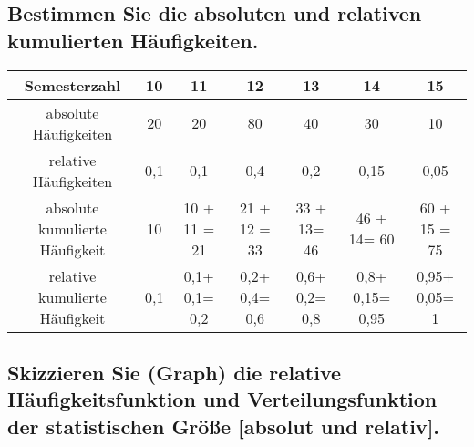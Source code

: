 \documentclass{article}
\begin{document}
\subsection{Bestimmen Sie die absoluten und relativen kumulierten Häufigkeiten.}
\begin{center}
\begin{tabular}{| c | c | c | c | c | c | c | } 
\hline
Semesterzahl & 10 & 11 & 12 & 13 & 14 & 15 \\ 
\hline
absolute Häufigkeiten & 20 & 20 & 80 & 40 & 30 & 10 \\ 
\hline
relative Häufigkeiten & 0,1 & 0,1 & 0,4 & 0,2 & 0,15 & 0,05 \\
\hline
absolute kumulierte Häufigkeit & 10 & 10 + 11 = 21 & 21 + 12 = 33 & 33 + 13= 46 & 46 + 14= 60 & 60 + 15 = 75\\
\hline
relative kumulierte Häufigkeit & 0,1 & 0,1+ 0,1= 0,2 & 0,2+ 0,4= 0,6 & 0,6+ 0,2= 0,8 & 0,8+ 0,15= 0,95 & 0,95+ 0,05= 1\\
\hline
\end{tabular}
\end{center}

\subsection{Skizzieren Sie (Graph) die relative Häufigkeitsfunktion und Verteilungsfunktion der statistischen Größe [absolut und relativ].}




\end{document}
